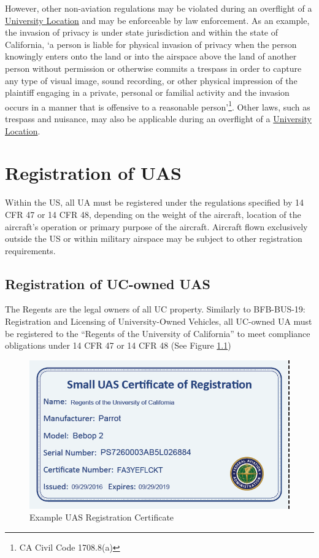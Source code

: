 \documentclass[
]{book}
\begin{document}
However, other non-aviation regulations may be violated during an overflight of a \protect\hyperlink{UL}{University Location} and may be enforceable by law enforcement. As an example, the invasion of privacy is under state jurisdiction and within the state of California, `a person is liable for physical invasion of privacy when the person knowingly enters onto the land or into the airspace above the land of another person without permission or otherwise commits a trespass in order to capture any type of visual image, sound recording, or other physical impression of the plaintiff engaging in a private, personal or familial activity and the invasion occurs in a manner that is offensive to a reasonable person'\footnote{CA Civil Code 1708.8(a)}. Other laws, such as trespass and nuisance, may also be applicable during an overflight of a \protect\hyperlink{UL}{University Location}.

\hypertarget{ch-registration}{%
\chapter{Registration of UAS}\label{ch-registration}}

Within the US, all UA must be registered under the regulations specified by 14 CFR 47 or 14 CFR 48, depending on the weight of the aircraft, location of the aircraft's operation or primary purpose of the aircraft. Aircraft flown exclusively outside the US or within military airspace may be subject to other registration requirements.

\hypertarget{registration-of-uc-owned-uas}{%
\section{Registration of UC-owned UAS}\label{registration-of-uc-owned-uas}}

The Regents are the legal owners of all UC property. Similarly to BFB-BUS-19: Registration and Licensing of University-Owned Vehicles, all UC-owned UA must be registered to the ``Regents of the University of California'' to meet compliance obligations under 14 CFR 47 or 14 CFR 48 (See Figure \ref{fig:reg-cert})

\begin{figure}

{\centering \includegraphics[width=0.5\linewidth]{images/reg_cert} 

}

\caption{Example UAS Registration Certificate}\label{fig:reg-cert}
\end{figure}
\end{document}
